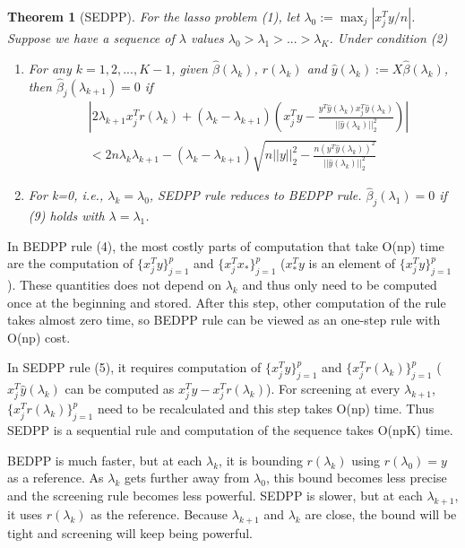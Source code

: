 \documentclass{article}
\newtheorem{theorem}{Theorem}[section]
\begin{document}
\begin{theorem}[SEDPP]
    For the lasso problem (1), let $\lambda_0:=\max_j|x_j^Ty/n|$. Suppose we have a sequence of $\lambda$ values $\lambda_0>\lambda_1>...>\lambda_K$. Under condition (2)
    \begin{enumerate}
        \item For any $k=1,2,...,K-1$, given $\hat{\beta}(\lambda_k)$, $r(\lambda_k)$ and $\hat{y}(\lambda_k):=X\hat{\beta}(\lambda_k)$, then $\hat{\beta}_j(\lambda_{k+1})=0$ if
        \begin{equation}
            \begin{split}
                &\left|2\lambda_{k+1}x_j^Tr(\lambda_k)+(\lambda_k-\lambda_{k+1})\left( x_j^Ty-\frac{y^T\hat{y}(\lambda_k)x_j^T\hat{y}(\lambda_k)}{||\hat{y}(\lambda_k)||_2^2}\right)\right|\\&<2n\lambda_k\lambda_{k+1}-(\lambda_k-\lambda_{k+1})\sqrt{n||y||_2^2-\frac{n(y^T\hat{y}(\lambda_k))^2}{||\hat{y}(\lambda_k)||_2^2}}
            \end{split}
        \end{equation}
        \item For k=0, i.e., $\lambda_k=\lambda_0$, SEDPP rule reduces to BEDPP rule. $\hat{\beta}_j(\lambda_1)=0$ if (9) holds with $\lambda=\lambda_1$.
    \end{enumerate}
\end{theorem}

In BEDPP rule (4), the most costly parts of computation that take O(np) time are the computation of $\{x_j^Ty\}_{j=1}^p$ and $\{x_j^Tx_*\}_{j=1}^p$ ($x_*^Ty$ is an element of $\{x_j^Ty\}_{j=1}^p$). These quantities does not depend on $\lambda_k$ and thus only need to be computed once at the beginning and stored. After this step, other computation of the rule takes almost zero time, so BEDPP rule can be viewed as an one-step rule with O(np) cost.

In SEDPP rule (5), it requires computation of $\{x_j^Ty\}_{j=1}^p$ and $\{x_j^Tr(\lambda_k)\}_{j=1}^p$ ($x_j^T\hat{y}(\lambda_k)$ can be computed as $x_j^Ty-x_j^Tr(\lambda_k)$). For screening at every $\lambda_{k+1}$, $\{x_j^Tr(\lambda_k)\}_{j=1}^p$ need to be recalculated and this step takes O(np) time. Thus SEDPP is a sequential rule and computation of the sequence takes O(npK) time.

BEDPP is much faster, but at each $\lambda_k$, it is bounding $r(\lambda_k)$ using $r(\lambda_0)=y$ as a reference. As $\lambda_k$ gets further away from $\lambda_0$, this bound becomes less precise and the screening rule becomes less powerful. SEDPP is slower, but at each $\lambda_{k+1}$, it uses $r(\lambda_{k})$ as the reference. Because $\lambda_{k+1}$ and $\lambda_k$ are close, the bound will be tight and screening will keep being powerful.
\end{document}
